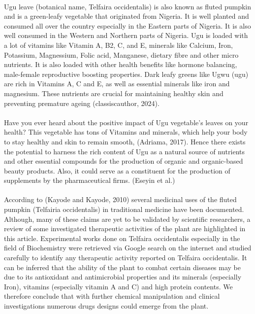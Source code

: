\paragraph*{} Ugu leave (botanical name, Telfaira occidentalis) is also known as fluted pumpkin and is a green-leafy vegetable that originated from Nigeria. It is well planted and consumed all over the country especially in the Eastern parts of Nigeria. It is also well consumed in the Western and Northern parts of Nigeria. Ugu is loaded with a lot of vitamins like Vitamin A, B2, C, and E, minerals like Calcium, Iron, Potassium, Magnessium, Folic acid, Manganese, dietary fibre and other micro nutrients. It is also loaded with other health benefits like hormone balancing, male-female reproductive boosting properties. Dark leafy greens like Ugwu (ugu) are rich in Vitamins A, C and E, as well as essential minerals like iron and magnesium. These nutrients are crucial for maintaining healthy skin and preventing premature ageing (classiscauthor, 2024).

\paragraph*{} Have you ever heard about the positive impact of Ugu vegetable's leaves on your health? This vegetable has tons of Vitamins  and minerals, which help your body to stay healthy and skin to remain smooth, (Adriama, 2017). Hence there exists the potential to harness the rich content of Ugu as a natural source of nutrients and other essential compounds for the production of organic and organic-based beauty products. Also, it could serve as a constituent for the production of supplements by the pharmaceutical firms. (Eseyin et al.)

\paragraph*{} According to (Kayode and Kayode, 2010) several medicinal uses of the fluted pumpkin (Telfairia occidentalis) in traditional medicine have been documented. Although, many of these claims are yet to be validated by scientific researchers, a review of some investigated therapeutic activities of the plant are highlighted in this article. Experimental works done on Telfaira occidentalis especially in the field  of Biochemistry were retrieved via Google search on the internet and studied carefully to identify any therapeutic activity reported on Telfaira occidentalis. It can be inferred that the ability of the plant to combat certain diseases may be due to its antioxidant and antimicrobial properties and its minerals (especially Iron), vitamins (especially vitamin A and C) and high protein contents. We therefore conclude that with further chemical manipulation and clinical investigations numerous drugs designs could emerge from the plant.

